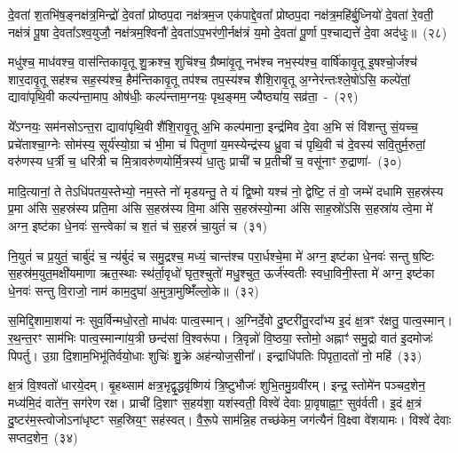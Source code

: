 दे॒वता॑ श॒तभि॑ष॒ङ्नक्ष॑त्र॒मिन्द्रो॑ दे॒वता᳚ प्रोष्ठप॒दा नक्ष॑त्रम॒ज एक॑पाद्दे॒वता᳚ प्रोष्ठप॒दा नक्ष॑त्र॒महि॑र्बु॒ध्नियो॑ दे॒वता॑ रे॒वती॒ नक्ष॑त्रं पू॒षा दे॒वता᳚\-ऽ\-श्व॒युजौ॒ नक्ष॑त्रम॒श्विनौ॑ दे॒वता॑ऽप॒\-भर॑णी॒र्नक्ष॑त्रं य॒मो दे॒वता॑ पू॒र्णा प॒श्चाद्यत्ते॑ दे॒वा अद॑धुः॥~(२८)

{\anuvakamend[{फल्गु॑नी॒ नक्ष॑त्रं॒ वस॑व॒स्त्रय॑स्त्रिꣳशच्च}]}%

मधु॑श्च॒ माध॑वश्च॒ वास॑न्तिकावृ॒तू शु॒क्रश्च॒ शुचि॑श्च॒ ग्रैष्मा॑वृ॒तू नभ॑श्च नभ॒स्य॑श्च॒ वार्\mbox{}षि॑कावृ॒तू इ॒षश्चो॒र्जश्च॑ शार॒दावृ॒तू सह॑श्च सह॒स्य॑श्च॒ हैम॑न्तिकावृ॒तू तप॑श्च तप॒स्य॑श्च शैशि॒रावृ॒तू अ॒ग्नेर॑न्तःश्ले॒षो॑\-ऽसि॒ कल्पे॑तां॒ द्यावा॑\-पृथि॒वी कल्प॑न्ता॒माप॒ ओष॑धीः॒ कल्प॑न्ताम॒ग्नयः॒ पृथ॒ङ्मम॒ ज्यैष्ठ्या॑य॒ सव्र॑ता॒~-~(२९)

ये᳚\-ऽग्नयः॒ सम॑नसो\-ऽन्त॒रा द्यावा॑\-पृथि॒वी शै॑शि॒रावृ॒तू अ॒भि कल्प॑माना॒ इन्द्र॑मिव दे॒वा अ॒भि सं वि॑शन्तु सं॒यच्च॒ प्रचे॑ताश्चा॒ग्नेः सोम॑स्य॒ सूर्य॑स्यो॒ग्रा च॑ भी॒मा च॑ पितृ॒णां य॒मस्येन्द्र॑स्य ध्रु॒वा च॑ पृथि॒वी च॑ दे॒वस्य॑ सवि॒तुर्म॒रुतां॒ वरु॑णस्य ध॒र्त्री च॒ धरि॑त्री च मि॒त्रावरु॑णयोर्मि॒त्रस्य॑ धा॒तुः प्राची॑ च प्र॒तीची॑ च॒ वसू॑नाꣳ रु॒द्राणा॑-~(३०)

मादि॒त्यानां॒ ते ते\-ऽधि॑पतय॒स्तेभ्यो॒ नम॒स्ते नो॑ मृडयन्तु॒ ते यं द्वि॒ष्मो यश्च॑ नो॒ द्वेष्टि॒ तं वो॒ जम्भे॑ दधामि स॒हस्र॑स्य प्र॒मा अ॑सि स॒हस्र॑स्य प्रति॒मा अ॑सि स॒हस्र॑स्य वि॒मा अ॑सि स॒हस्र॑स्यो॒न्मा अ॑सि साह॒स्रो॑\-ऽसि स॒हस्रा॑य त्वे॒मा मे॑ अग्न॒ इष्ट॑का धे॒नवः॑ स॒न्त्वेका॑ च श॒तं च॑ स॒हस्रं॑ चा॒युतं॑ च~(३१)

नि॒युतं॑ च प्र॒युतं॒ चार्बु॑दं च॒ न्य॑र्बुदं च समु॒द्रश्च॒ मध्यं॒ चान्त॑श्च परा॒र्धश्चे॒मा मे॑ अग्न॒ इष्ट॑का धे॒नवः॑ सन्तु ष॒ष्टिः स॒हस्र॑म॒युत॒मक्षी॑यमाणा ऋत॒स्थाः स्थ॑र्ता॒वृधो॑ घृत॒श्चुतो॑ मधु॒श्चुत॒ ऊर्ज॑स्वतीः स्वधा॒विनी॒स्ता मे॑ अग्न॒ इष्ट॑का धे॒नवः॑ सन्तु वि॒राजो॒ नाम॑ काम॒दुघा॑ अ॒मुत्रा॒मुष्मिँ॑ल्लो॒के॥~(३२)

{\anuvakamend[{सव्र॑ता रु॒द्राणा॑म॒युतं॑ च॒ पञ्च॑चत्वारिꣳशच्च}]}%

स॒मिद्दि॒शामा॒शया॑ नः सुव॒र्विन्मधो॒रतो॒ माध॑वः पात्व॒स्मान्। अ॒ग्निर्दे॒वो दु॒ष्टरी॑तु॒रदा᳚भ्य इ॒दं क्ष॒त्रꣳ र॑क्षतु॒ पात्व॒स्मान्। र॒थ॒न्त॒रꣳ साम॑भिः पात्व॒स्मान्गा॑य॒त्री छन्द॑सां वि॒श्वरू॑पा। त्रि॒वृन्नो॑ वि॒ष्ठया॒ स्तोमो॒ अह्नाꣳ॑ समु॒द्रो वात॑ इ॒दमोजः॑ पिपर्तु। उ॒ग्रा दि॒शाम॒भिभू॑तिर्वयो॒धाः शुचिः॑ शु॒क्रे अह॑न्योज॒सीना᳚। इन्द्राधि॑\-पतिः पिपृता॒दतो॑ नो॒ महि॑~(३३)

क्ष॒त्रं वि॒श्वतो॑ धारये॒दम्। बृ॒हथ्साम॑ क्षत्र॒भृद्वृ॒द्धवृ॑ष्णियं त्रि॒ष्टुभौजः॑ शुभि॒तमु॒ग्रवी॑रम्। इन्द्र॒ स्तोमे॑न पञ्चद॒शेन॒ मध्य॑मि॒दं वाते॑न॒ सग॑रेण रक्ष। प्राची॑ दि॒शाꣳ स॒हय॑शा॒ यश॑स्वती॒ विश्वे॑ देवाः प्रा॒वृषाह्ना॒ꣳ॒ सुव॑र्वती। इ॒दं क्ष॒त्रं दु॒ष्टर॑म॒स्त्वोजो\-ऽना॑धृष्टꣳ सह॒स्रिय॒ꣳ॒ सह॑स्वत्। वै॒रू॒पे साम॑न्नि॒ह तच्छ॑केम॒ जग॑त्यैनं वि॒क्ष्वा वे॑शयामः। विश्वे॑ देवाः सप्तद॒शेन॒~(३४)

